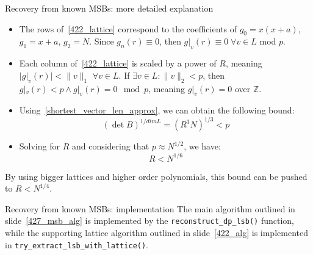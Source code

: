 \documentclass[usepdftitle=false]{beamer}
\begin{document}
\begin{frame}{Recovery from known MSBs: more detailed explanation}\label{422_explanation}
\begin{itemize}
    \item The rows of~\ref{422_lattice} correspond to the coefficients of $g_0 = x(x+a)$, $g_1 = x+a$,
          $g_2 = N$. Since $g_n(r) \equiv 0$, then $g|_v(r) \equiv 0 \;\forall v\in L$ mod $p$.
    \item Each column of~\ref{422_lattice} is scaled by a power of $R$, meaning $|g|_v(r)| < \|v\|_1$
          $\forall v\in L$. If $\exists v\in L: \|v\|_2 < p$, then $g|_v(r) < p \land g|_v(r) = 0 \mod p$,
          meaning $g|_v(r) = 0$ over $\mathbb{Z}$.
    \item Using~\ref{shortest_vector_len_approx}, we can obtain the following bound:
        $$
        (\det B)^{1/dim L} = (R^3 N)^{1/3} < p
        $$
    \item  Solving for $R$ and considering that $p\approx N^{1/2}$, we have:
        $$
        R < N^{1/6}
        $$
\end{itemize}

By using bigger lattices and higher order polynomials, this bound can be pushed to $R < N^{1/4}$.
\end{frame}

\begin{frame}[fragile=singleslide]{Recovery from known MSBs: implementation}
The main algorithm outlined in slide~\ref{427_msb_alg} is implemented by the 
\texttt{reconstruct\_dp\_lsb()} function, while the supporting lattice algorithm outlined in
slide~\ref{422_alg} is implemented in \texttt{try\_extract\_lsb\_with\_lattice()}.
\end{frame}
\end{document}
